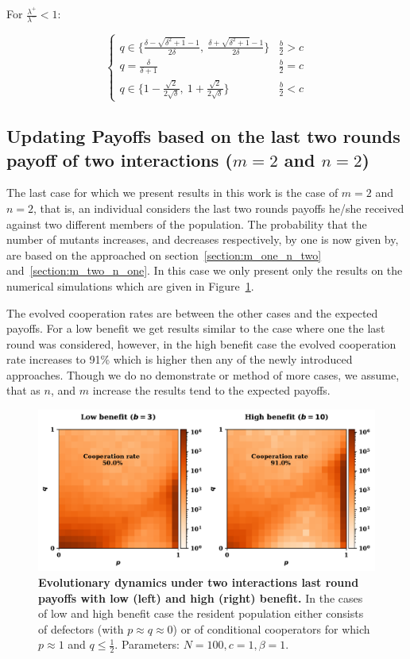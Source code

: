 \documentclass[11pt]{article}
\theoremstyle{plainCl1}
\theoremstyle{plainCl2}
\begin{document}
For \(\frac{\lambda^{+}}{\lambda^{-}} < 1\):

\begin{equation}
\begin{cases}
  q \in \{\frac{\delta - \sqrt{\delta^{2} + 1} - 1}{2 \delta}, \  \frac{\delta + \sqrt{\delta^{2} + 1} - 1}{2 \delta}\}  & \frac{b}{2} > c \\
  q = \frac{\delta}{\delta + 1}  & \frac{b}{2} = c \\
  q \in \{1 - \frac{\sqrt{2}}{2 \sqrt{\delta}}, \  1 + \frac{\sqrt{2}}{2 \sqrt{\delta}}\} & \frac{b}{2} < c
\end{cases}
\end{equation}



\subsection{Updating Payoffs based on the last two rounds payoff of two interactions (\(m=2\) and \(n=2\))}

The last case for which we present results in this work is the case of \(m=2\)
and \(n=2\), that is, an individual considers the last two rounds payoffs he/she
received against two different members of the population. The probability that
the number of mutants increases, and decreases respectively, by one is now given
by, are based on the approached on section~\ref{section:m_one_n_two}
and~\ref{section:m_two_n_one}. In this case we only present only the results on
the numerical simulations which are given in
Figure~\ref{fig:two_rounds_opponents_results}.

The evolved cooperation rates are between the other cases and the expected
payoffs. For a low benefit we get results similar to the case where one the last
round was considered, however, in the high benefit case the evolved cooperation
rate increases to 91\% which is higher then any of the newly introduced
approaches. Though we do no demonstrate or method of more cases, we assume, that
as \(n\), and \(m\) increase the results tend to the expected payoffs. 

\begin{figure}[!htbp]
  \centering 
  \includegraphics[width=.70\textwidth]{static/two_rounds_opponents_donation_game.pdf}
  \caption{\textbf{Evolutionary dynamics under two interactions last round
  payoffs with low (left) and high (right) benefit.} In the cases of low and
  high benefit case the resident population either consists of defectors (with
  \(p \approx q \approx 0\)) or of conditional cooperators for which \(p \approx
  1\) and \(q \leq \frac{1}{2}\). Parameters: \(N =100, c=1, \beta=1\).
  }\label{fig:two_rounds_opponents_results}
\end{figure}
\end{document}
